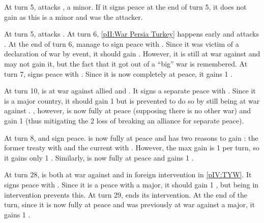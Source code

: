 \begin{exemple}
  At turn 5, \TUR attacks \paysDamas, a minor. If it signs peace at the end of
  turn 5, it does not gain \STAB as this is a minor and \TUR was the
  attacker.

  At turn 5, \TUR attacks \paysDamas. At turn 6, \ref{pII:War Persia Turkey}
  happens early and \paysPerse attacks \TUR. At the end of turn 6, \TUR manage
  to sign peace with \paysPerse. Since it was victim of a declaration of war
  by event, it should gain \STAB. However, it is still at war against
  \paysDamas and may not gain it, but the fact that it got out of a ``big''
  war is remembered. At turn 7, \TUR signs peace with \paysDamas. Since it is
  now completely at peace, it gains 1 \STAB.
\end{exemple}

\begin{exemple}
  At turn 10, \TUR is at war against allied \HIS and \VEN. It signs a separate
  peace with \VEN. Since it is a major country, it should gain 1 \STAB but is
  prevented to do so by still being at war against \HIS. \VEN, however, is now
  fully at peace (supposing there is no other war) and gain 1 \STAB (thus
  mitigating the 2 \STAB loss of breaking an alliance for separate peace). 

  At turn 8, \TUR and \HIS sign peace. \TUR is now fully at peace and has two
  reasons to gain \STAB: the former treaty with \VEN and the current with
  \HIS. However, the max gain is 1 per turn, so it gains only 1
  \STAB. Similarly, \HIS is now fully at peace and gains 1 \STAB.
\end{exemple}

\begin{exemple}
  At turn 28, \POL is both at war against \RUS and in foreign intervention in
  \ref{pIV:TYW}. It signs peace with \RUS. Since it is a peace with a major,
  it should gain 1 \STAB, but being in intervention prevents this. At turn 29,
  \POL ends its intervention. At the end of the turn, since it is now fully at
  peace and was previously at war against a major, it gains 1 \STAB.
\end{exemple}



